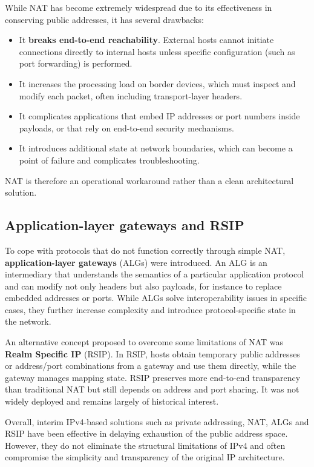 \documentclass[11pt,a4paper,openany]{report}
\begin{document}
While NAT has become extremely widespread due to its effectiveness in conserving public addresses, it has several drawbacks:

\begin{itemize}
\item It \textbf{breaks end-to-end reachability}. External hosts cannot initiate connections directly to internal hosts unless specific configuration (such as port forwarding) is performed.
\item It increases the processing load on border devices, which must inspect and modify each packet, often including transport-layer headers.
\item It complicates applications that embed IP addresses or port numbers inside payloads, or that rely on end-to-end security mechanisms.
\item It introduces additional state at network boundaries, which can become a point of failure and complicates troubleshooting.
\end{itemize}

NAT is therefore an operational workaround rather than a clean architectural solution.

\subsection{Application-layer gateways and RSIP}

To cope with protocols that do not function correctly through simple NAT, \textbf{application-layer gateways} (ALGs) were introduced. An ALG is an intermediary that understands the semantics of a particular application protocol and can modify not only headers but also payloads, for instance to replace embedded addresses or ports. While ALGs solve interoperability issues in specific cases, they further increase complexity and introduce protocol-specific state in the network.

An alternative concept proposed to overcome some limitations of NAT was \textbf{Realm Specific IP} (RSIP). In RSIP, hosts obtain temporary public addresses or address/port combinations from a gateway and use them directly, while the gateway manages mapping state. RSIP preserves more end-to-end transparency than traditional NAT but still depends on address and port sharing. It was not widely deployed and remains largely of historical interest.

Overall, interim IPv4-based solutions such as private addressing, NAT, ALGs and RSIP have been effective in delaying exhaustion of the public address space. However, they do not eliminate the structural limitations of IPv4 and often compromise the simplicity and transparency of the original IP architecture.
\end{document}
